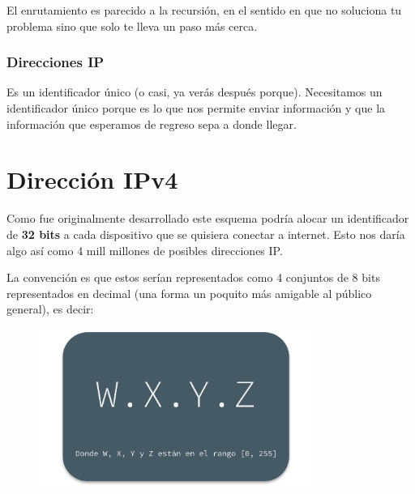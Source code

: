 \documentclass[12pt, fleqn]{report}                             %
\theoremstyle{break}                                            %
\begin{document}
            El enrutamiento es parecido a la recursión, en el sentido en que no soluciona tu problema
            sino que solo te lleva un paso más cerca.


            \subsubsection{Direcciones IP}

                Es un identificador único (o casi, ya verás después porque). Necesitamos
                un identificador único porque es lo que nos permite enviar información y que 
                la información que esperamos de regreso sepa a donde llegar.



        \clearpage
        \section{Dirección IPv4}

            Como fue originalmente desarrollado este esquema podría alocar un identificador
            de \textbf{32 bits} a cada dispositivo que se quisiera conectar a internet.
            Esto nos daría algo así como 4 mill millones de posibles direcciones IP.

            La convención es que estos serían representados como 4 conjuntos de 8 bits representados
            en decimal (una forma un poquito más amigable al público general), es decir:

            \begin{figure}[h]
                \centering
                \includegraphics[width=0.80\textwidth]{IPv4}
            \end{figure}
\end{document}
